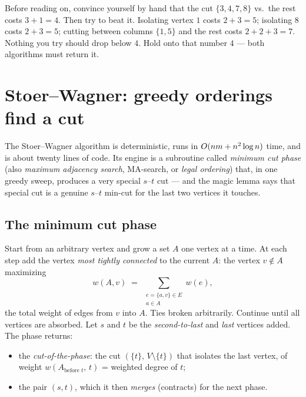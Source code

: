 \begin{labbox}
Before reading on, convince yourself by hand that the cut $\{3,4,7,8\}$ vs.\ the rest costs $3+1=4$. Then try to beat it. Isolating vertex $1$ costs $2+3=5$; isolating $8$ costs $2+3=5$; cutting between columns $\{1,5\}$ and the rest costs $2+2+3=7$. Nothing you try should drop below $4$. Hold onto that number $4$ --- both algorithms must return it.
\end{labbox}

\section{Stoer--Wagner: greedy orderings find a cut}

The Stoer--Wagner algorithm is deterministic, runs in $O(nm + n^2\log n)$ time, and is about twenty lines of code. Its engine is a subroutine called \emph{minimum cut phase} (also \emph{maximum adjacency search}, MA-search, or \emph{legal ordering}) that, in one greedy sweep, produces a very special $s$--$t$ cut --- and the magic lemma says that special cut is a genuine $s$--$t$ min-cut for the last two vertices it touches.

\subsection{The minimum cut phase}

Start from an arbitrary vertex and grow a set $A$ one vertex at a time. At each step add the vertex \emph{most tightly connected} to the current $A$: the vertex $v\notin A$ maximizing
\[
  w(A,v) \;=\; \sum_{\substack{e=\{a,v\}\in E\\ a\in A}} w(e),
\]
the total weight of edges from $v$ into $A$. Ties broken arbitrarily. Continue until all vertices are absorbed. Let $s$ and $t$ be the \emph{second-to-last} and \emph{last} vertices added. The phase returns:
\begin{itemize}
  \item the \emph{cut-of-the-phase}: the cut $(\{t\},\,V\setminus\{t\})$ that isolates the last vertex, of weight $w(A_{\text{before }t},\,t)$ = weighted degree of $t$;
  \item the pair $(s,t)$, which it then \emph{merges} (contracts) for the next phase.
\end{itemize}

